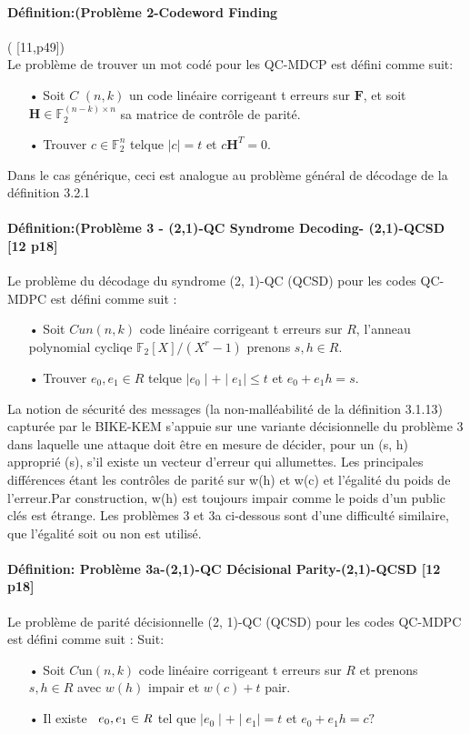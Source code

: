 \documentclass[12pt,openany]{report}
\begin{document}
\paragraph{Définition:(Problème 2-Codeword Finding} ( [11,p49])\\
Le problème de trouver un mot codé pour les QC-MDCP est défini comme suit:
\begin{itemize}
\item[•] Soit $\mathit{C}$  $(n,k)$ un code linéaire corrigeant t erreurs sur $\mathbf{F}$, et soit $\mathbf{H} \in \mathbb{F}^{(n-k)\times n}_2$ sa matrice de contrôle de parité.
\item[•] Trouver $ c \in \mathbb{F}^n_2$ telque $\mid c \mid =t$ et $ c\mathbf{H}^T=0$.
\end{itemize}
Dans le cas générique, ceci est analogue au problème général de décodage de la définition
3.2.1
\paragraph{Définition:(Problème 3 - (2,1)-QC Syndrome Decoding- (2,1)-QCSD [12 p18]\\}
Le problème du décodage du syndrome (2, 1)-QC (QCSD) pour les codes QC-MDPC
est défini comme suit :
\begin{itemize}
\item[•] Soit $ \mathit{C} un (n,k)$ code linéaire corrigeant t erreurs sur $ \mathit{R}$, l'anneau polynomial cycliqe $\mathbb{F}_2[X]/(X^r-1)$ prenons                    
$s,h \in \mathit{R}$.
\item[•] Trouver $e_0,e_1 \in \mathit{R}$ telque $ \mid e_0 \mid +\mid e_1 \mid \leq t $ et $ e_0 + e_1h =s$.
\end{itemize}
La notion de sécurité des messages (la non-malléabilité de la définition 3.1.13) capturée
par le BIKE-KEM s’appuie sur une variante décisionnelle du problème 3 dans laquelle une attaque
doit être en mesure de décider, pour un (s, h) approprié (s), s’il existe un vecteur d’erreur qui
allumettes. Les principales différences étant les contrôles de parité sur w(h) et w(c) et l’égalité
du poids de l’erreur.Par construction, w(h) est toujours impair comme le poids d’un public
clés est étrange. Les problèmes 3 et 3a ci-dessous sont d’une difficulté similaire, que l’égalité soit ou non
est utilisé.
\paragraph{Définition: Problème 3a-(2,1)-QC Décisional Parity-(2,1)-QCSD [12 p18]\\}
Le problème de parité décisionnelle (2, 1)-QC (QCSD) pour les codes QC-MDPC est défini comme suit :
Suit:
\begin{itemize}
\item[•] Soit $\mathit{C}$un$(n,k)$ code linéaire corrigeant t erreurs sur $ \mathit{R}$ et prenons $ s,h \in \mathit{R}$ avec $ w(h)$ impair et $w(c)+t$ pair.
\item[•] Il	 existe $\hspace{0.2cm} e_0,e_1 \in \mathit{R}$ tel que $ \mid e_0 \mid + \mid e_1 \mid = t $ et $ e_0+e_1h=c?$
\end{itemize}
\end{document}
